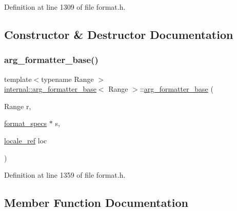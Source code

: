 Definition at line 1309 of file format.\+h.



\subsection{Constructor \& Destructor Documentation}
\mbox{\label{classinternal_1_1arg__formatter__base_ad70a5b77be0b45b880609cc8fdf1c151}} 
\subsubsection{\texorpdfstring{arg\+\_\+formatter\+\_\+base()}{arg\_formatter\_base()}}
{\footnotesize\ttfamily template$<$typename Range $>$ \\
\hyperlink{classinternal_1_1arg__formatter__base}{internal\+::arg\+\_\+formatter\+\_\+base}$<$ Range $>$\+::\hyperlink{classinternal_1_1arg__formatter__base}{arg\+\_\+formatter\+\_\+base} (\begin{DoxyParamCaption}\item[{Range}]{r,  }\item[{\hyperlink{classinternal_1_1arg__formatter__base_acff46f7da1afa536210eb77a2ea0d775}{format\+\_\+specs} $\ast$}]{s,  }\item[{\hyperlink{classinternal_1_1locale__ref}{locale\+\_\+ref}}]{loc }\end{DoxyParamCaption})\hspace{0.3cm}{\ttfamily [inline]}}



Definition at line 1359 of file format.\+h.



\subsection{Member Function Documentation}
\mbox{\label{classinternal_1_1arg__formatter__base_a5fa077fa175a4a91af8a6774f548411f}} 
